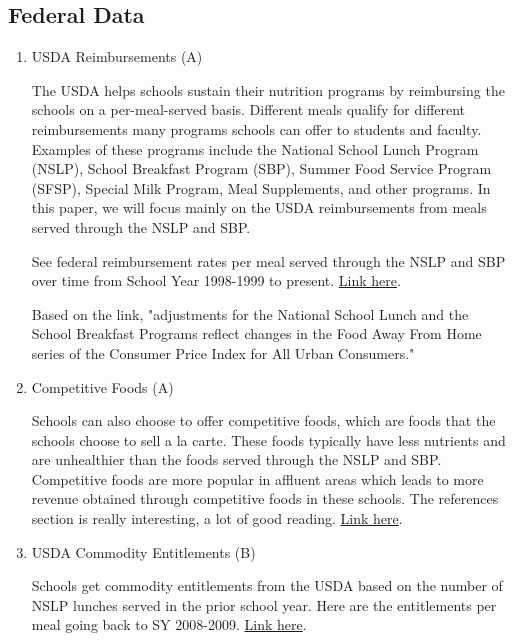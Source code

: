 \documentclass[12pt]{article}
\begin{document}
\subsection{Federal Data}
\begin{enumerate}
	
	\item USDA Reimbursements (A)
	
	The USDA helps schools sustain their nutrition programs by reimbursing the schools on a per-meal-served basis. Different meals qualify for different reimbursements  many programs schools can offer to students and faculty. Examples of these programs include the National School Lunch Program (NSLP), School Breakfast Program (SBP), Summer Food Service Program (SFSP), Special Milk Program, Meal Supplements, and other programs. In this paper, we will focus mainly on the USDA reimbursements from meals served through the NSLP and SBP.
	
	See federal reimbursement rates per meal served through the NSLP and SBP over time from School Year 1998-1999 to present. \href{https://www.fns.usda.gov/cn/rates-reimbursement}{Link here}.
	
	Based on the link, "adjustments for the National School Lunch and the School Breakfast Programs reflect changes in the Food Away From Home series of the Consumer Price Index for All Urban Consumers."
	
	\item Competitive Foods (A)

	Schools can also choose to offer competitive foods, which are foods that the schools choose to sell a la carte. These foods typically have less nutrients and are unhealthier than the foods served through the NSLP and SBP. Competitive foods are more popular in affluent areas which leads to more revenue obtained through competitive foods in these schools. The references section is really interesting, a lot of good reading. \href{https://www.ers.usda.gov/webdocs/publications/43770/38064_eib114.pdf?v=0}{Link here}.%

	\item USDA Commodity Entitlements (B)
	
	Schools get commodity entitlements from the USDA based on the number of NSLP lunches served in the prior school year. Here are the entitlements per meal going back to SY 2008-2009. \href{https://www.fns.usda.gov/usda-fis/value-donated-foods-notices}{Link here}.
	

\end{enumerate}
\end{document}
